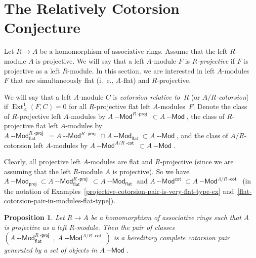 \documentclass[12pt,a4paper]{amsart}
\newcommand{\+}{\nobreakdash-}
\renewcommand{\:}{\colon}
\newcommand{\rarrow}{\longrightarrow}
\DeclareMathOperator{\Ext}{Ext}
\newcommand{\Modl}{{\operatorname{\mathsf{--Mod}}}}
\newcommand{\proj}{\mathsf{proj}}
\renewcommand{\flat}{\mathsf{flat}}
\renewcommand{\cot}{\mathsf{cot}}
\newcommand{\dcot}{{\operatorname{\mathsf{-cot}}}}
\newcommand{\dproj}{{\operatorname{\mathsf{-proj}}}}
\newcommand{\Section}[1]{\bigskip\section{#1}\medskip}
\theoremstyle{plain}
\newtheorem{prop}[thm]{Proposition}
\theoremstyle{definition}
\begin{document}
\Section{The Relatively Cotorsion Conjecture}

 Let $R\rarrow A$ be a homomorphism of associative rings.
 Assume that the left $R$\+module $A$ is projective.
 We will say that a left $A$\+module $F$ is \emph{$R$\+projective}
if $F$ is projective as a left $R$\+module.
 In this section, we are interested in left $A$\+modules $F$ that are
simultaneously flat (i.~e., $A$\+flat) and $R$\+projective.

 We will say that a left $A$\+module $C$ is \emph{cotorsion relative
to~$R$} (or \emph{$A/R$\+cotorsion}) if $\Ext^1_A(F,C)=0$ for all
$R$\+projective flat left $A$\+modules~$F$.
 Denote the class of $R$\+projective left $A$\+modules by
$A\Modl^{R\dproj}\subset A\Modl$, the class of $R$\+projective flat
left $A$\+modules by $A\Modl_\flat^{R\dproj}=A\Modl^{R\dproj}\cap
A\Modl_\flat\subset A\Modl$, and the class of $A/R$\+cotorsion
left $A$\+modules by $A\Modl^{A/R\dcot}\subset A\Modl$.

 Clearly, all projective left $A$\+modules are flat and $R$\+projective
(since we are assuming that the left $R$\+module $A$ is projective).
 So we have $A\Modl_\proj\subset A\Modl_\flat^{R\dproj}\subset
A\Modl_\flat$ and $A\Modl^\cot\subset A\Modl^{A/R\dcot}$
(in the notation
of Examples~\ref{projective-cotorsion-pair-is-very-flat-type-ex}
and~\ref{flat-cotorsion-pair-in-modules-flat-type}).

\begin{prop} \label{relatively-cotorsion-cotorsion-pair-prop}
 Let $R\rarrow A$ be a homomorphism of associative rings such that
$A$ is projective as a left $R$\+module.
 Then the pair of classes
$(A\Modl_\flat^{R\dproj},\>A\Modl^{A/R\dcot})$ is a hereditary
complete cotorsion pair generated by a set of objects in $A\Modl$.
\end{prop}
\end{document}
